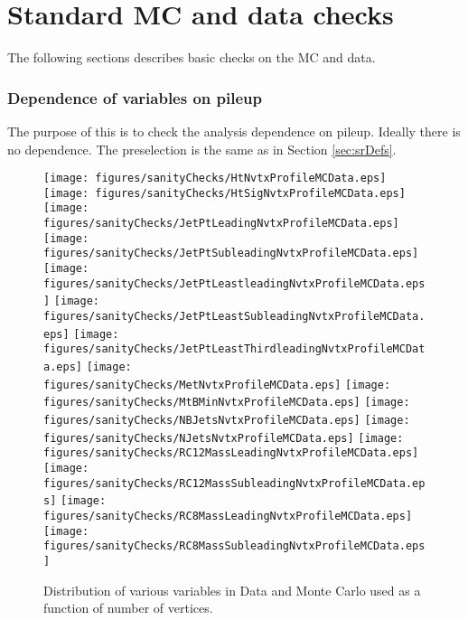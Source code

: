 
\chapter{Standard MC and data checks}

The following sections describes basic checks on the MC and data.

\label{sec:Standard_Checks}

\subsection{Dependence of variables on pileup}

The purpose of this is to check the analysis dependence on pileup.  Ideally there is no dependence.  The preselection is the same as in Section \ref{sec:srDefs}.%


\begin{figure}[htbp]
\begin{center} 
\texttt{[image: figures/sanityChecks/HtNvtxProfileMCData.eps]}
\texttt{[image: figures/sanityChecks/HtSigNvtxProfileMCData.eps]}
\texttt{[image: figures/sanityChecks/JetPtLeadingNvtxProfileMCData.eps]}
\texttt{[image: figures/sanityChecks/JetPtSubleadingNvtxProfileMCData.eps]}
\texttt{[image: figures/sanityChecks/JetPtLeastleadingNvtxProfileMCData.eps]}
\texttt{[image: figures/sanityChecks/JetPtLeastSubleadingNvtxProfileMCData.eps]}
\texttt{[image: figures/sanityChecks/JetPtLeastThirdleadingNvtxProfileMCData.eps]}
\texttt{[image: figures/sanityChecks/MetNvtxProfileMCData.eps]}
\texttt{[image: figures/sanityChecks/MtBMinNvtxProfileMCData.eps]}
\texttt{[image: figures/sanityChecks/NBJetsNvtxProfileMCData.eps]}
\texttt{[image: figures/sanityChecks/NJetsNvtxProfileMCData.eps]}
\texttt{[image: figures/sanityChecks/RC12MassLeadingNvtxProfileMCData.eps]}
\texttt{[image: figures/sanityChecks/RC12MassSubleadingNvtxProfileMCData.eps]}
\texttt{[image: figures/sanityChecks/RC8MassLeadingNvtxProfileMCData.eps]}
\texttt{[image: figures/sanityChecks/RC8MassSubleadingNvtxProfileMCData.eps]}
\caption{Distribution of various variables in Data and Monte Carlo used as a function of number of vertices.}
\label{fig:Fit2ele}
\end{center}
\end{figure}

